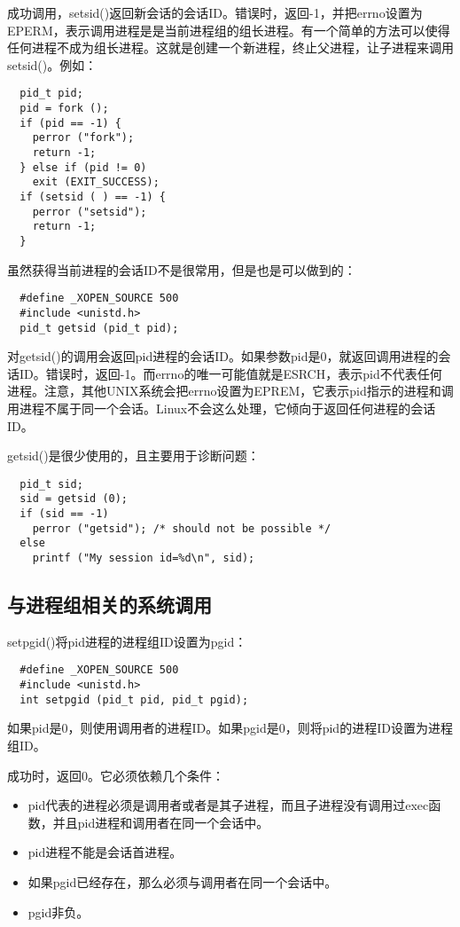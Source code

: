 成功调用，setsid()返回新会话的会话ID。错误时，返回-1，并把errno设置为EPERM，表示调用进程是是当前进程组的组长进程。有一个简单的方法可以使得任何进程不成为组长进程。这就是创建一个新进程，终止父进程，让子进程来调用setsid()。例如：

\begin{lstlisting}
  pid_t pid;
  pid = fork ();
  if (pid == -1) {
    perror ("fork");
    return -1;
  } else if (pid != 0)
    exit (EXIT_SUCCESS);
  if (setsid ( ) == -1) {
    perror ("setsid");
    return -1;
  }
\end{lstlisting}

虽然获得当前进程的会话ID不是很常用，但是也是可以做到的：

\begin{lstlisting}
  #define _XOPEN_SOURCE 500
  #include <unistd.h>
  pid_t getsid (pid_t pid);
\end{lstlisting}

对getsid()的调用会返回pid进程的会话ID。如果参数pid是0，就返回调用进程的会话ID。错误时，返回-1。而errno的唯一可能值就是ESRCH，表示pid不代表任何进程。注意，其他UNIX系统会把errno设置为EPREM，它表示pid指示的进程和调用进程不属于同一个会话。Linux不会这么处理，它倾向于返回任何进程的会话ID。

getsid()是很少使用的，且主要用于诊断问题：

\begin{lstlisting}
  pid_t sid;
  sid = getsid (0);
  if (sid == -1)
    perror ("getsid"); /* should not be possible */
  else
    printf ("My session id=%d\n", sid);
\end{lstlisting}

\subsection{与进程组相关的系统调用}

setpgid()将pid进程的进程组ID设置为pgid：

\begin{lstlisting}
  #define _XOPEN_SOURCE 500
  #include <unistd.h>
  int setpgid (pid_t pid, pid_t pgid);
\end{lstlisting}

如果pid是0，则使用调用者的进程ID。如果pgid是0，则将pid的进程ID设置为进程组ID。

成功时，返回0。它必须依赖几个条件：

\begin{itemize}
\item pid代表的进程必须是调用者或者是其子进程，而且子进程没有调用过exec函数，并且pid进程和调用者在同一个会话中。
\item pid进程不能是会话首进程。
\item 如果pgid已经存在，那么必须与调用者在同一个会话中。
\item pgid非负。
\end{itemize}

